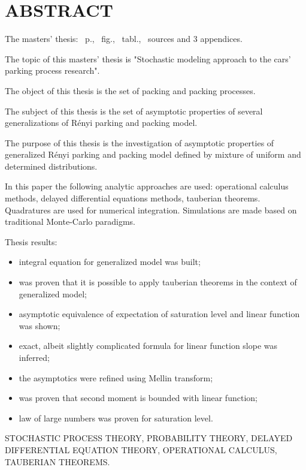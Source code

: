 \chapter*{ABSTRACT}
The masters' thesis: \pageref*{MyLastPage}~p., \totfig~fig., \tottab~tabl., ~sources and 3 appendices.

The topic of this masters' thesis is "Stochastic modeling approach to the cars' parking process research".

The object of this thesis is the set of packing and packing processes.

The subject of this thesis is the set of asymptotic properties of several generalizations of R{\'e}nyi parking and packing model.

The purpose of this thesis is the investigation of asymptotic properties of generalized R{\'e}nyi parking and packing model defined by mixture of uniform and determined distributions. 

In this paper the following analytic approaches are used: operational calculus methods, delayed differential equations methods, tauberian theorems. Quadratures are used for numerical integration. Simulations are made based on traditional Monte-Carlo paradigms.

Thesis results:
\begin{itemize}
	\item integral equation for generalized model was built;
	\item was proven that it is possible to apply tauberian theorems in the context of generalized model;
	\item asymptotic equivalence of expectation of saturation level and linear function was shown;
	\item exact, albeit slightly complicated formula for linear function slope was inferred;
	\item the asymptotics were refined using Mellin transform;
	\item was proven that second moment is bounded with linear function;
	\item law of large numbers was proven for saturation level.
\end{itemize}

\MakeUppercase{stochastic process theory, probability theory, delayed differential equation theory, operational calculus, tauberian theorems.}